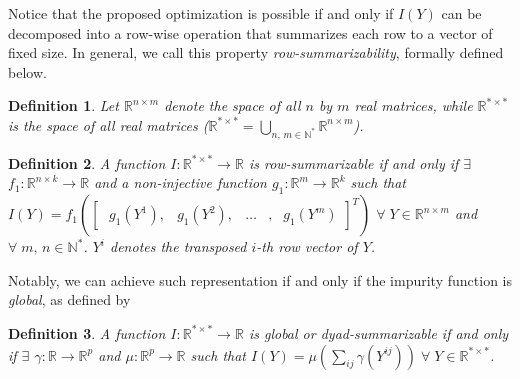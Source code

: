 \documentclass[sn-mathphys-num]{sn-jnl}%
\theoremstyle{thmstyleone}%
\theoremstyle{thmstyletwo}%
\theoremstyle{thmstylethree}%
\newtheorem{definition}{Definition}%
\begin{document}
Notice that the proposed optimization is possible if and only if $I(Y)$ can be decomposed into a row-wise operation that summarizes each row to a vector of fixed size. In general, we call this property \emph{row-summarizability}, formally defined below.
\medskip
% 
\begin{definition}
    \label{def:matrix spaces}
    Let $\mathbb{R}^{n\times m}$ denote the space of all $n$ by $m$ real matrices, while $\mathbb{R}^{*\times *}$ is
    the space of all real matrices %
    ($\mathbb{R}^{*\times *}=\bigcup_{n,\,m\in \mathbb{N}^*}\mathbb{R}^{n\times m}$).
\end{definition}
%
\begin{definition}
    \label{def:row-summarizability}
    A function $I\colon \mathbb{R}^{*\times *}\to \mathbb{R}$ is \emph{row-summarizable} if and only if
    $\exists$
    $f_1\colon \mathbb{R}^{n\times k} \to \mathbb{R}$
    and a non-injective function
    $g_1 \colon \mathbb{R}^{m}\to \mathbb{R}^k$
    such that $I(Y)= f_1(
        \begin{bmatrix}
        \;g_1(Y^{1}), & g_1(Y^{2}), & \dots &, & g_1(Y^m)
        \end{bmatrix}^T
    )$ 
    $\forall \; Y \in \mathbb{R}^{n\times m}$ and $\forall \; m,\,n \in \mathbb{N}^*$. $Y^i$ denotes the transposed $i$-th row vector of $Y$.
\end{definition}
%
\medskip
Notably, we can achieve such representation if and only if the impurity function is \emph{global}, as defined by 
\medskip
% 
\begin{definition}
    \label{def:global}
    A function $I\colon \mathbb{R}^{*\times *}\to \mathbb{R}$ is \emph{global} or \emph{dyad-summarizable} if and only if $\exists$
    $\gamma\colon \mathbb{R}\to\mathbb{R}^p$
    and
    $\mu\colon \mathbb{R}^p\to\mathbb{R}$
    such that
    $I(Y) = \mu(\sum_{ij} \gamma(Y^{ij})) \; \forall \; Y \in \mathbb{R}^{* \times *}$.
\end{definition}
\end{document}
